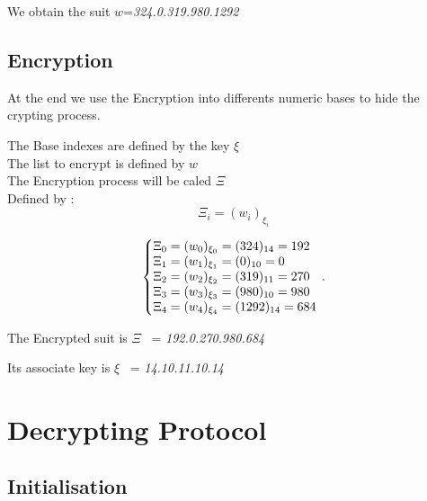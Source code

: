 \documentclass[letterpaper,10pt,english]{sphinxmanual}
\begin{document}
\begin{flushleft}
We obtain the suit $w$=\textit{324.0.319.980.1292}
\end{flushleft}

\subsection{Encryption}
\begin{flushleft}
At the end we use the Encryption into differents numeric bases to hide the crypting process.

The Base indexes are defined by the key $ \xi $ \\
The list to encrypt is defined by $w$ \\
The Encryption process will be caled $ \Xi $ \\
Defined by : 
\begin{equation}
\Xi_{i}=(w_{i})_{\xi_{i}}
\end{equation}
\end{flushleft}

\begin{equation}
\centering
\left\{\begin{array}{@{}l@{}}
\Xi_{0} = (w_{0})_{\xi_{0}}=(324)_{14}=192 \\
\Xi_{1} = (w_{1})_{\xi_{1}}=(0)_{10}=0 \\
\Xi_{2} = (w_{2})_{\xi_{2}}=(319)_{11}=270 \\
\Xi_{3} = (w_{3})_{\xi_{3}}=(980)_{10}=980 \\
\Xi_{4} = (w_{4})_{\xi_{4}}=(1292)_{14}=684 \\
\end{array}\right.\,.
\end{equation}

\begin{flushleft}
The Encrypted suit is $ \Xi $ \ = \textit{192.0.270.980.684}

Its associate key is $ \xi $  \ = \textit{14.10.11.10.14}
\end{flushleft}

\newpage

\section{Decrypting Protocol}

\subsection{Initialisation}
\end{document}
